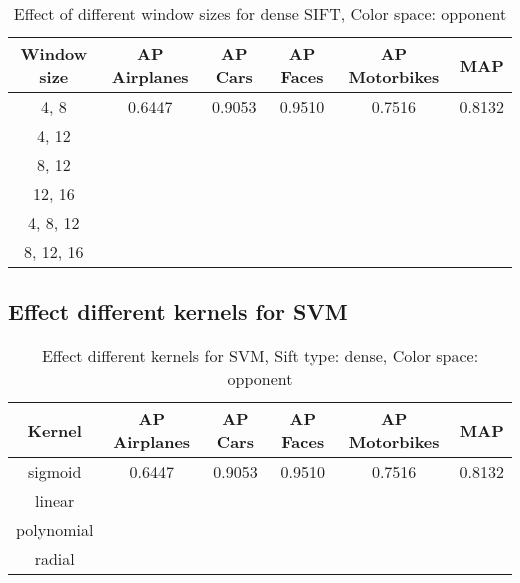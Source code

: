 \begin{table}[H]
\begin{tabular}{|c|ccccc|}
\hline
\textbf{Window size} & \textbf{AP Airplanes} & \textbf{AP Cars} & \textbf{AP Faces} & \textbf{AP Motorbikes} & \textbf{MAP}\\
\hline
4, 8 & 0.6447 & 0.9053 & 0.9510 & 0.7516 & 0.8132\\
4, 12 & & & & & \\
8, 12 & & & & & \\
12, 16 & & & & & \\
4, 8, 12 & & & & & \\
8, 12, 16 & & & & & \\
\hline
\end{tabular}
\caption{Effect of different window sizes for dense SIFT,  Color space: opponent}
\end{table}




\subsection{Effect different kernels for SVM}

\begin{table}[H]
\begin{tabular}{|c|ccccc|}
\hline
\textbf{Kernel} & \textbf{AP Airplanes} & \textbf{AP Cars} & \textbf{AP Faces} & \textbf{AP Motorbikes} & \textbf{MAP}\\
\hline
sigmoid & 0.6447 & 0.9053 & 0.9510 & 0.7516 & 0.8132\\
linear & & & & & \\
polynomial & & & & & \\
radial & & & & & \\
\hline
\end{tabular}
\caption{Effect different kernels for SVM, Sift type: dense, Color space: opponent}
\end{table}

